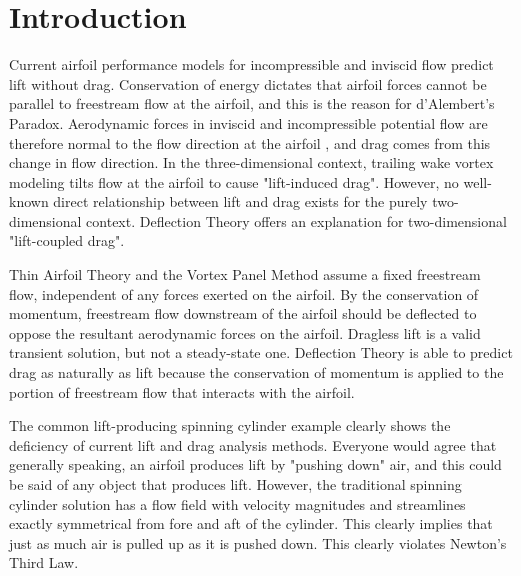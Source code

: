 \section{Introduction}
Current airfoil performance models for incompressible and inviscid flow predict lift without drag.
Conservation of energy dictates that airfoil forces cannot be parallel to freestream flow at the airfoil,
and this is the reason for d'Alembert's Paradox.
Aerodynamic forces in inviscid and incompressible potential flow are therefore normal to the flow direction at the airfoil
, and drag comes from this change in flow direction.
In the three-dimensional context, trailing wake vortex modeling tilts flow at the airfoil to cause "lift-induced drag".
However, no well-known direct relationship between lift and drag exists for the purely two-dimensional context.
Deflection Theory offers an explanation for two-dimensional "lift-coupled drag".

Thin Airfoil Theory and the Vortex Panel Method assume a fixed freestream flow, independent of any forces exerted on the airfoil.
By the conservation of momentum, freestream flow downstream of the airfoil should be deflected to oppose the resultant aerodynamic forces on the airfoil.
Dragless lift is a valid transient solution, but not a steady-state one.
Deflection Theory is able to predict drag as naturally as lift because the conservation of momentum is applied to the portion of freestream flow that interacts with the airfoil.

The common lift-producing spinning cylinder example clearly shows the deficiency of current lift and drag analysis methods.
Everyone would agree that generally speaking, an airfoil produces lift by "pushing down" air, and this could be said of any object that produces lift.
However, the traditional spinning cylinder solution has a flow field with velocity magnitudes and streamlines exactly symmetrical from fore and aft of the cylinder.
This clearly implies that just as much air is pulled up as it is pushed down. This clearly violates Newton's Third Law.

